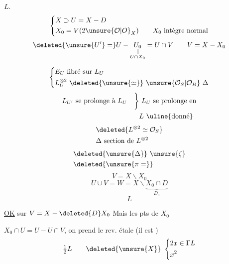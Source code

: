 
$L$.
\[
\left\{\begin{aligned}&X\supset U=X-D\\&X_0=V(2\unsure{\mathcal O|O}_X)\qquad X_0\ \text{intègre normal}\end{aligned}\right.
\]
\[
\deleted{\unsure{U'}=}U-\underset{\substack{\Vert\\U\cap X_0}}{U_0}=U\cap V\qquad V=X-X_0
\]


\[
\left\{\begin{aligned}&E_U\ \text{fibré sur }L_U\\&L_U^{\otimes2}\ \deleted{\unsure{\simeq}}\ \unsure{\mathcal O_S|\mathcal O_B}\ \Delta\end{aligned}\right.
\]
\[
\begin{aligned}L_{U'}\ \text{se prolonge à } L_U\quad\bigg\}&\ L_U\ \text{se prolonge en}\\&L\ \text{\uline{donné}}\end{aligned}
\]
\[
\begin{aligned}&\deleted{L^{\otimes2}\simeq \mathcal O_S}\\&\Delta\ \text{section de } L^{\otimes2}\end{aligned}
\]
\[
\begin{aligned}&\deleted{\unsure{\Delta}}\ \unsure{\zeta}\\&\deleted{\unsure{\pi=}}\end{aligned}
\]
\[
V=X\smallsetminus X_0
\]
\[
U\cup V=W=X\smallsetminus\underbrace{X_0\cap D}_{D_0}
\]
\[
L
\]


\uline{OK} sur $V=X-\deleted{D}X_0$ Mais  les pts de $X_0$

 $X_0\cap U=U-U\cap V$, on prend le rev. étale (il est )
\[
\tfrac12 L\qquad\deleted{\unsure{X}}\ \left\{\begin{aligned}&2x\in\Gamma L\\&x^2\end{aligned}\right.
\]
